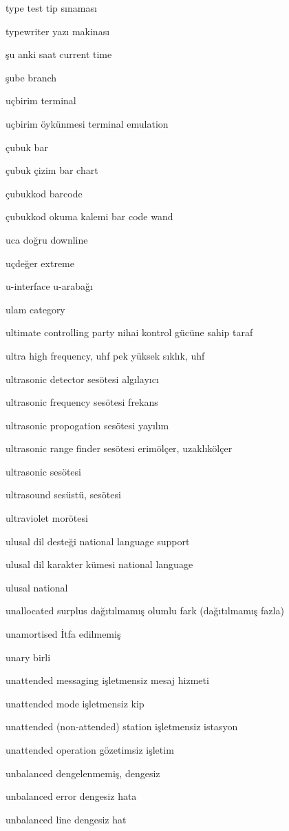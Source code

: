 \documentclass[12pt,fleqn]{article}\usepackage{../../common}
\begin{document}
type test tip sınaması

typewriter yazı makinası

şu anki saat current time

şube branch

uçbirim terminal

uçbirim öykünmesi terminal emulation

çubuk bar

çubuk çizim bar chart

çubukkod barcode

çubukkod okuma kalemi bar code wand

uca doğru downline

uçdeğer extreme

u-interface u-arabağı

ulam category

ultimate controlling party nihai kontrol gücüne sahip taraf

ultra high frequency, uhf pek yüksek sıklık, uhf

ultrasonic detector sesötesi algılayıcı

ultrasonic frequency sesötesi frekans

ultrasonic propogation sesötesi yayılım

ultrasonic range finder sesötesi erimölçer, uzaklıkölçer

ultrasonic sesötesi

ultrasound sesüstü, sesötesi

ultraviolet morötesi

ulusal dil desteği national language support

ulusal dil karakter kümesi national language

ulusal national

unallocated surplus dağıtılmamış olumlu fark (dağıtılmamış fazla)

unamortised İtfa edilmemiş

unary birli

unattended messaging işletmensiz mesaj hizmeti

unattended mode işletmensiz kip

unattended (non-attended) station işletmensiz istasyon

unattended operation gözetimsiz işletim

unbalanced dengelenmemiş, dengesiz

unbalanced error dengesiz hata

unbalanced line dengesiz hat
\end{document}
